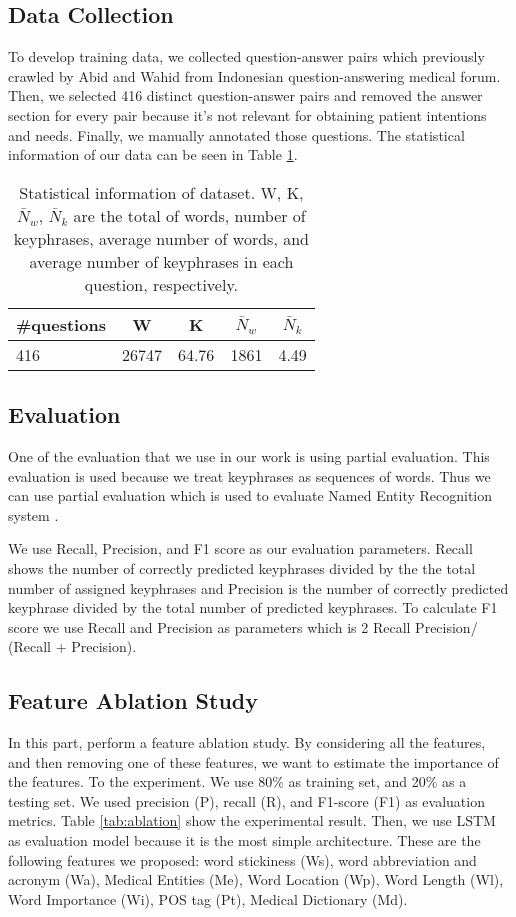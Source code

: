 \subsection{Data Collection}
To develop training data, we collected question-answer pairs which previously crawled by Abid \cite{skripsiKakAbid} and Wahid \cite{skripsiWahid} from Indonesian question-answering medical forum. Then, we selected 416 distinct question-answer pairs and removed the answer section for every pair because it's not relevant for obtaining patient intentions and needs. Finally, we manually annotated those questions. The statistical information of our data can be seen in Table \ref{tab:descriptive_stats}.

\begin{table}
	\caption{Statistical information of dataset. W, K, $\bar{N}_{w}$, $\bar{N}_{k}$ are the total of words, number of keyphrases, average number of words, and average number of keyphrases in each question, respectively.}
	\label{tab:descriptive_stats}
	\begin{tabular}{lcccc}
		\toprule
		\#questions&W&K&$\bar{N}_{w}$&$\bar{N}_{k}$\\
		\midrule
		416 & 26747  & 64.76 & 1861 & 4.49 \\
		
		\bottomrule
	\end{tabular}
\end{table}
\subsection{Evaluation}
One of the evaluation that we use in our work is using partial evaluation. This evaluation is used because we treat keyphrases as sequences of words. Thus we can use partial evaluation which is used to evaluate Named Entity Recognition system \cite{seki2003probabilistic}.  

We use Recall, Precision, and F1 score as our evaluation parameters. Recall shows the number of correctly predicted keyphrases divided by the the total number of assigned keyphrases and Precision is the number of correctly predicted keyphrase divided by the total number of predicted keyphrases. To calculate F1 score we use Recall and Precision as parameters which is 2  Recall  Precision/ (Recall + Precision).
\iffalse
\subsection{Feature Ablation Study}
In this part, perform a feature ablation study. By considering all the features, and then removing one of these features, we want to estimate the importance of the features. To the experiment. We use 80\% as training set, and 20\% as a testing set. We used precision (P), recall (R), and F1-score (F1) as evaluation metrics. Table \ref{tab:ablation} show the experimental result. Then, we use LSTM as evaluation model because it is the most simple architecture. These are the following features we proposed: word stickiness (Ws), word abbreviation and acronym (Wa), Medical Entities (Me), Word Location (Wp), Word Length (Wl), Word Importance (Wi), POS tag (Pt), Medical Dictionary (Md).

